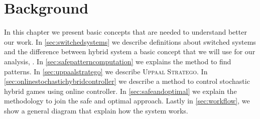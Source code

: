 \chapter{Background}
\label{ch:background}
In this chapter we present basic concepts that are needed 
to understand better our work. In \autoref{sec:switchedsystems} 
we describe definitions about switched systems and the 
difference between hybrid system a basic concept that we 
will use for our analysis, \cite{sanfelice2020hybrid}. 
In \autoref{sec:safepatterncomputation} we explains the method 
to find patterns. In \autoref{sec:uppaalstratego} we describe 
\textsc{Uppaal Stratego}. In \autoref{sec:onlinestochastichybridcontroller}
 we describe a method to control stochastic hybrid games using online 
 controller. In \autoref{sec:safeandoptimal} we explain the 
 methodology to join the safe and optimal approach. Lastly in 
\autoref{sec:workflow}, we show a general diagram that explain 
how the system works.
\clearpage
